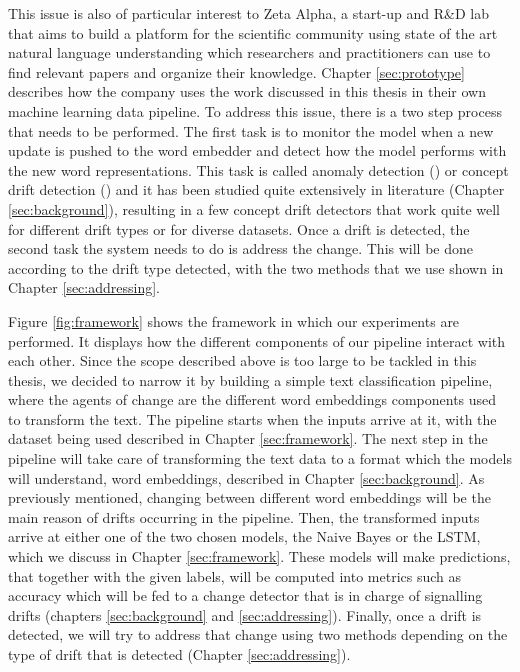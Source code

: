 \documentclass[12pt]{extreport}
\begin{document}
This issue is also of particular interest to Zeta Alpha, a start-up and R\&D lab that aims to build a platform for the scientific community using state of the art natural language understanding which researchers and practitioners can use to find relevant papers and organize their knowledge. Chapter \ref{sec:prototype} describes how the company uses the work discussed in this thesis in their own machine learning data pipeline. To address this issue, there is a two step process that needs to be performed. The first task is to monitor the model when a new update is pushed to the word embedder and detect how the model performs with the new word representations. This task is called anomaly detection (\cite{anomaly-detection}) or concept drift detection (\cite{survey-concept-drift}) and it has been studied quite extensively in literature (Chapter \ref{sec:background}), resulting in a few concept drift detectors that work quite well for different drift types or for diverse datasets. Once a drift is detected, the second task the system needs to do is address the change. This will be done according to the drift type detected, with the two methods that we use shown in Chapter \ref{sec:addressing}.

Figure \ref{fig:framework} shows the framework in which our experiments are performed. It displays how the different components of our pipeline interact with each other. Since the scope described above is too large to be tackled in this thesis, we decided to narrow it by building a simple text classification pipeline, where the agents of change are the different word embeddings components used to transform the text. The pipeline starts when the inputs arrive at it, with the dataset being used described in Chapter \ref{sec:framework}. The next step in the pipeline will take care of transforming the text data to a format which the models will understand, word embeddings, described in Chapter \ref{sec:background}. As previously mentioned, changing between different word embeddings will be the main reason of drifts occurring in the pipeline. Then, the transformed inputs arrive at either one of the two chosen models, the Naive Bayes or the LSTM, which we discuss in Chapter \ref{sec:framework}. These models will make predictions, that together with the given labels, will be computed into metrics such as accuracy which will be fed to a change detector that is in charge of signalling drifts (chapters \ref{sec:background} and \ref{sec:addressing}). Finally, once a drift is detected, we will try to address that change using two methods depending on the type of drift that is detected (Chapter \ref{sec:addressing}).
\end{document}
